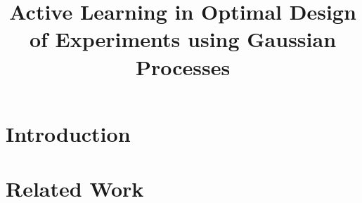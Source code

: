 \documentclass[conference]{IEEEtran}
\begin{document}
	
	
	\title{\LARGE \textbf{Active Learning in Optimal Design of Experiments using Gaussian Processes}
	}
	
	
	\author{
		} %
	
	
	\maketitle
	
	\begin{abstract}
	\end{abstract}
	
	
	\section{Introduction}
	\label{sec:introduction}
	
	
	
	
	
	
	
	
	\section{Related Work}
	\label{sec:related-work}
	
\end{document}
